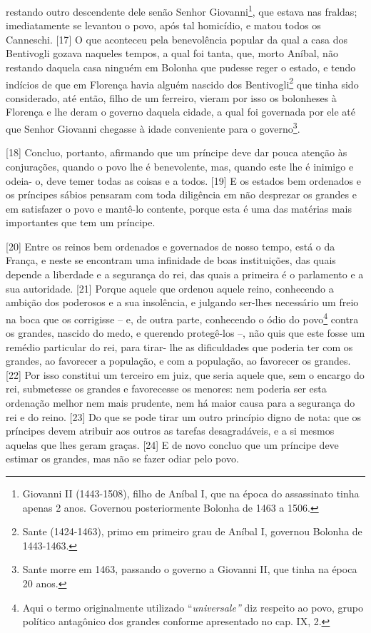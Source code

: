 restando outro descendente dele senão Senhor Giovanni\footnote{Giovanni
  II (1443-1508), filho de Aníbal I, que na época do assassinato tinha
  apenas 2 anos. Governou posteriormente Bolonha de 1463 a 1506.}, que
estava nas fraldas; imediatamente se levantou o povo, após tal
homicídio, e matou todos os Canneschi. {[}17{]} O que aconteceu pela
benevolência popular da qual a casa dos Bentivogli gozava naqueles
tempos, a qual foi tanta, que, morto Aníbal, não restando daquela casa
ninguém em Bolonha que pudesse reger o estado, e tendo indícios de que
em Florença havia alguém nascido dos Bentivogli\footnote{Sante
  (1424-1463), primo em primeiro grau de Aníbal I, governou Bolonha de
  1443-1463.} que tinha sido considerado, até então, filho de um
ferreiro, vieram por isso os bolonheses à Florença e lhe deram o governo
daquela cidade, a qual foi governada por ele até que Senhor Giovanni
chegasse à idade conveniente para o governo\footnote{Sante morre em
  1463, passando o governo a Giovanni II, que tinha na época 20 anos.}.

{[}18{]} Concluo, portanto, afirmando que um príncipe deve dar pouca
atenção às conjurações, quando o povo lhe é benevolente, mas, quando
este lhe é inimigo e odeia- o, deve temer todas as coisas e a todos.
{[}19{]} E os estados bem ordenados e os príncipes sábios pensaram com
toda diligência em não desprezar os grandes e em satisfazer o povo e
mantê-lo contente, porque esta é uma das matérias mais importantes que
tem um príncipe.

{[}20{]} Entre os reinos bem ordenados e governados de nosso tempo, está
o da França, e neste se encontram uma infinidade de boas instituições,
das quais depende a liberdade e a segurança do rei, das quais a primeira
é o parlamento e a sua autoridade. {[}21{]} Porque aquele que ordenou
aquele reino, conhecendo a ambição dos poderosos e a sua insolência, e
julgando ser-lhes necessário um freio na boca que os corrigisse -- e, de
outra parte, conhecendo o ódio do povo\footnote{Aqui o termo
  originalmente utilizado ``\emph{universale''} diz respeito ao povo,
  grupo político antagônico dos grandes conforme apresentado no cap. IX,
  2.} contra os grandes, nascido do medo, e querendo protegê-los --, não
quis que este fosse um remédio particular do rei, para tirar- lhe as
dificuldades que poderia ter com os grandes, ao favorecer a população, e
com a população, ao favorecer os grandes. {[}22{]} Por isso constitui um
terceiro em juiz, que seria aquele que, sem o encargo do rei, submetesse
os grandes e favorecesse os menores: nem poderia ser esta ordenação
melhor nem mais prudente, nem há maior causa para a segurança do rei e
do reino. {[}23{]} Do que se pode tirar um outro princípio digno de
nota: que os príncipes devem atribuir aos outros as tarefas
desagradáveis, e a si mesmos aquelas que lhes geram graças. {[}24{]} E
de novo concluo que um príncipe deve estimar os grandes, mas não se
fazer odiar pelo povo.


